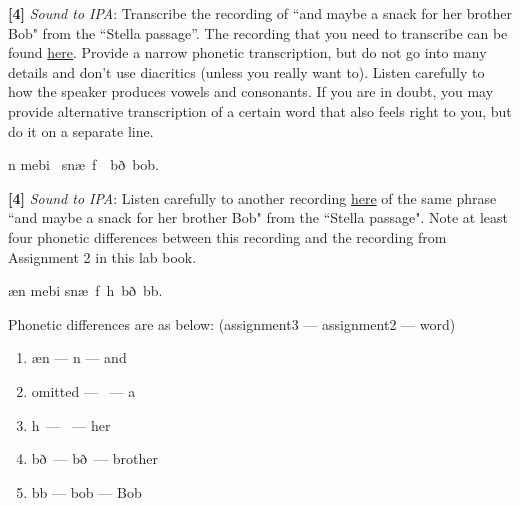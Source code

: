 \documentclass{../labbook}
\begin{document}
\begin{problem}{2}
\textbf{[4]} \textit{Sound to IPA}: Transcribe the recording of ``and maybe a snack for her brother Bob" from the ``Stella passage''. The recording that you need to transcribe can be found \href{https://drive.google.com/file/d/16fmkXCrlayT1Flpha4BS-S8ED8dwV61w/view?usp=sharing}{here}. Provide a narrow phonetic transcription, but do not go into many details and don't use diacritics (unless you really want to). Listen carefully to how the speaker produces vowels and consonants. If you are in doubt, you may provide alternative transcription of a certain word that also feels right to you, but do it on a separate line. 
\end{problem}
\begin{solution}
\textschwa n \textprimstress me\textsci bi \textschwa\ sn\ae\ f\textschwa\ \textturnrrtail \textrhookschwa\ \textprimstress b\textturnrrtail \textturnv ð\textrhookschwa\ bo\textupsilon b.
\end{solution}
\begin{problem}{3}
\textbf{[4]} \textit{Sound to IPA}: Listen carefully to another recording \href{https://drive.google.com/file/d/1YI6uoBzU_VhTnzGgkGsEjSM5zuPkD38H/view?usp=sharing}{here} of the same phrase ``and maybe a snack for her brother Bob" from the ``Stella passage". Note at least four phonetic differences between this recording and the recording from Assignment 2 in this lab book. 
\end{problem}
\begin{solution}
\ae n \textprimstress me\textsci bi sn\ae\ f\textschwa\ h\textrhookrevepsilon\ \textprimstress b\textturnr \textturnv ð\textschwa\ b\textturnscripta b.

Phonetic differences are as below: (assignment3 --- assignment2 --- word)
\begin{enumerate}
    \item \ae n --- \textschwa n --- and
    \item omitted  --- \textschwa\ --- a
    \item h\textrhookrevepsilon\ --- \textturnrrtail \textrhookschwa\ --- her
    \item b\textturnr \textturnv ð\textschwa\ --- b\textturnrrtail \textturnv ð\textrhookschwa\ --- brother
    \item b\textturnscripta b --- bo\textupsilon b --- Bob
\end{enumerate}
\end{solution}
\end{document}
